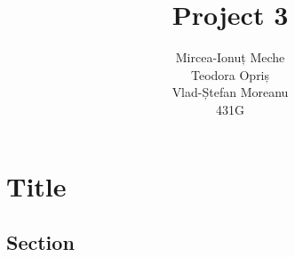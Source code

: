\documentclass[12pt, a4paper]{report}
\title{\huge\textbf{Project 3}}
\author{
    Mircea-Ionuț Meche\\
    Teodora Opriș\\
    Vlad-Ștefan Moreanu\\
    431G
}
\date{}
\begin{document}
\maketitle
\newpage

\tableofcontents

\chapter{Title}

    \lipsum[1]

    \section{Section}

        \lipsum[2]
\end{document}

